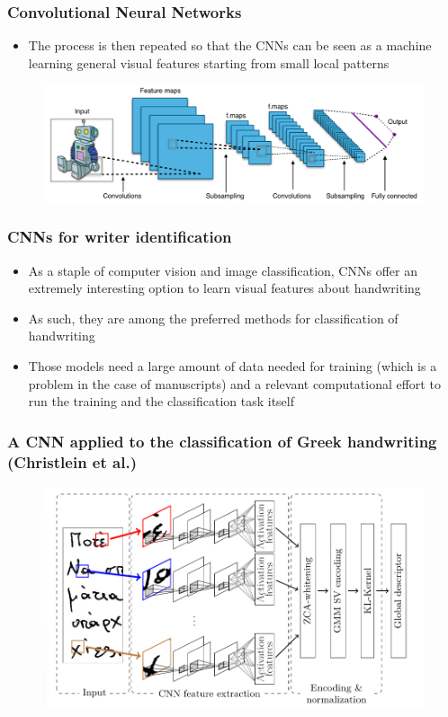 \documentclass{beamer}
\begin{document}
\begin{frame}
	\frametitle{Convolutional Neural Networks}
	\begin{itemize}
		\item The process is then repeated so that the CNNs can be seen as a machine learning general visual features starting from small local patterns
	\end{itemize}\begin{figure}[h]
	\centering
	\includegraphics[width=1\linewidth]{img/cnn}
	\label{fig:cnn}
	\end{figure}
\end{frame}
\begin{frame}
	\frametitle{CNNs for writer identification}
	\begin{itemize}
		\item As a staple of computer vision and image classification, CNNs offer an extremely interesting option to learn visual features about handwriting
		\item As such, they are among the preferred methods for classification of handwriting
		\item Those models need a large amount of data needed for training (which is a problem in the case of manuscripts) and a relevant computational effort to run the training and the classification task itself
	\end{itemize}
\end{frame}
\begin{frame}
	\frametitle{A CNN applied to the classification of Greek handwriting (Christlein et al.)}
	\begin{figure}[h]
		\centering
		\includegraphics[width=\linewidth]{img/christlein}
		\label{fig:christlein}
	\end{figure}
\end{frame}
\end{document}
